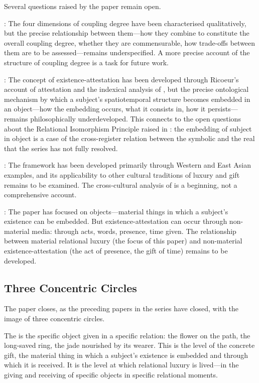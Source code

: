 \noindent
Several questions raised by the paper remain open.

: The four dimensions of coupling degree have been characterised qualitatively, but the precise relationship between them---how they combine to constitute the overall coupling degree, whether they are commensurable, how trade-offs between them are to be assessed---remains underspecified. A more precise account of the structure of coupling degree is a task for future work.

: The concept of existence-attestation has been developed through Ricoeur's account of attestation and the indexical analysis of  \parencite{paperxv}, but the precise ontological mechanism by which a subject's spatiotemporal structure becomes embedded in an object---how the embedding occurs, what it consists in, how it persists---remains philosophically underdeveloped. This connects to the open questions about the Relational Isomorphism Principle raised in : the embedding of subject in object is a case of the cross-register relation between the symbolic and the real that the series has not fully resolved.

: The framework has been developed primarily through Western and East Asian examples, and its applicability to other cultural traditions of luxury and gift remains to be examined. The cross-cultural analysis of  is a beginning, not a comprehensive account.

: The paper has focused on objects---material things in which a subject's existence can be embedded. But existence-attestation can occur through non-material media: through acts, words, presence, time given. The relationship between material relational luxury (the focus of this paper) and non-material existence-attestation (the act of presence, the gift of time) remains to be developed.

\subsection{Three Concentric Circles}
\label{p16:subsec:circles}

\noindent
The paper closes, as the preceding papers in the series have closed, with the image of three concentric circles.

The  is the specific object given in a specific relation: the flower on the path, the long-saved ring, the jade nourished by its wearer. This is the level of the concrete gift, the material thing in which a subject's existence is embedded and through which it is received. It is the level at which relational luxury is lived---in the giving and receiving of specific objects in specific relational moments.

